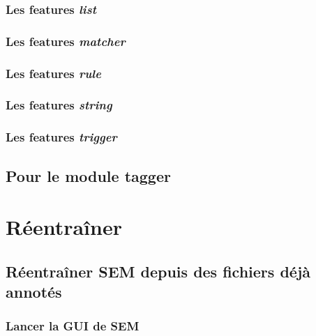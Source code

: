 \documentclass[12pt]{article}
\begin{document}
            \subsubsection{Les features \textit{list}}
            

            \subsubsection{Les features \textit{matcher}}
            

            \subsubsection{Les features \textit{rule}}
            

            \subsubsection{Les features \textit{string}}
            

            \subsubsection{Les features \textit{trigger}}
            

        \subsection{Pour le module tagger}
        
    
    \section{Réentraîner \SEM}
    
    
        \subsection{Réentraîner SEM depuis des fichiers déjà annotés}
        
            \subsubsection{Lancer la GUI de SEM}
            
            
\end{document}
